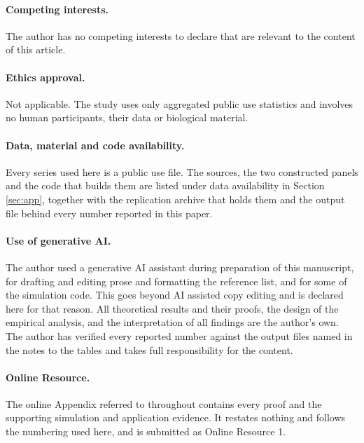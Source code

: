 \documentclass[12pt]{article}
\theoremstyle{definition}
\numberwithin{equation}{section}
\begin{document}
\paragraph{Competing interests.} The author has no competing interests to
declare that are relevant to the content of this article.

\paragraph{Ethics approval.} Not applicable. The study uses only aggregated
public use statistics and involves no human participants, their data or
biological material.

\paragraph{Data, material and code availability.} Every series used here is a
public use file. The sources, the two constructed panels and the code that
builds them are listed under data availability in Section \ref{sec:app},
together with the replication archive that holds them and the output file
behind every number reported in this paper.

\paragraph{Use of generative AI.} The author used a generative AI assistant
during preparation of this manuscript, for drafting and editing prose and
formatting the reference list, and for some of the simulation code. This goes
beyond AI assisted copy editing and is declared here for that reason. All
theoretical results and their proofs, the design of the empirical analysis, and
the interpretation of all findings are the author's own. The author has verified
every reported number against the output files named in the notes to the tables
and takes full responsibility for the content.

\paragraph{Online Resource.} The online Appendix referred to throughout
contains every proof and the supporting simulation and application evidence. It
restates nothing and follows the numbering used here, and is submitted as
Online Resource 1.
\end{document}
